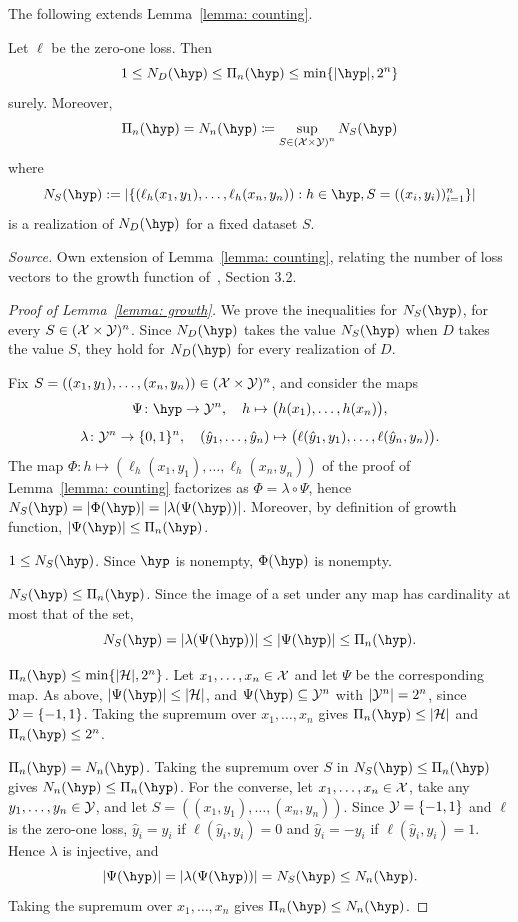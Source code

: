 \documentclass[reqno]{amsart}
\begin{document}
The following extends Lemma~\ref{lemma: counting}.

\begin{lemma}\label{lemma: growth}
Let $\ell$ be the zero-one loss. Then
\[
 1\le N_D(\hyp)\le\Pi_{n}(\hyp)\le\min\{\vert \hyp \vert,2^n\}
\]
surely. Moreover,
\[
\Pi_n(\hyp)  = N_n(\hyp) \coloneq \sup_{S\in{(\X\times\Y)}^n} N_S(\hyp)
\]
where \[ 
N_S(\hyp):= \left\vert\{(\ell_h(x_1,y_1),\ldots,\ell_h(x_n,y_n)):h\in\hyp, S = ((x_i,y_i))_{i=1}^n\}\right\vert 
\] is a realization of $N_D(\hyp)$ for a fixed dataset $S$. 

\textnormal{\emph{Source.} Own extension of Lemma~\ref{lemma: counting}, relating the number of loss vectors to the growth function of~\cite{mohri2018foundations}, Section 3.2.}

\begin{proof}[Proof of Lemma~\ref{lemma: growth}]
We prove the inequalities for $N_S(\hyp)$, for every $S\in(\mathcal{X}\times\mathcal{Y})^n$. Since $N_D(\hyp)$ takes the value $N_S(\hyp)$ when $D$ takes the value $S$, they hold for $N_D(\hyp)$ for every realization of $D$.

Fix $S=((x_1,y_1),\ldots,(x_n,y_n))\in(\mathcal{X}\times\mathcal{Y})^n$, and consider the maps
\[
\Psi\colon\hyp\to\Y^n,\quad h\mapsto\bigl(h(x_1),\ldots,h(x_n)\bigr),
\]
\[
\lambda\colon\mathcal{Y}^n\to\{0,1\}^n,\quad (\hat y_1,\ldots,\hat y_n)\mapsto\bigl(\ell(\hat y_1,y_1),\ldots,\ell(\hat y_n,y_n)\bigr).
\]
The map $\Phi\colon h\mapsto(\ell_h(x_1,y_1),\ldots,\ell_h(x_n,y_n))$ of the proof of Lemma~\ref{lemma: counting} factorizes as $\Phi=\lambda\circ\Psi$, hence $N_S(\hyp) = |\Phi(\hyp)| = |\lambda(\Psi(\hyp))|$. Moreover, by definition of growth function, $|\Psi(\hyp)|\le\Pi_n(\hyp)$.

\emph{$1\le N_S(\hyp)$.} Since $\hyp$ is nonempty, $\Phi(\hyp)$ is nonempty.

\emph{$N_S(\hyp)\le\Pi_n(\hyp)$.} Since the image of a set under any map has cardinality at most that of the set,
\[
N_S(\hyp) = |\lambda(\Psi(\hyp))| \le |\Psi(\hyp)| \le \Pi_n(\hyp).
\]

\emph{$\Pi_n(\hyp)\le\min\{\card,2^n\}$.} Let $x_1,\ldots,x_n\in\mathcal{X}$ and let $\Psi$ be the corresponding map. As above, $|\Psi(\hyp)|\le\card$, and $\Psi(\hyp)\subseteq\Y^n$ with $|\mathcal{Y}^n| = 2^n$, since $\mathcal{Y}=\{-1,1\}$. Taking the supremum over $x_1,\ldots,x_n$ gives $\Pi_n(\hyp)\le\card$ and $\Pi_n(\hyp)\le2^n$.

\emph{$\Pi_n(\hyp) = N_n(\hyp)$.} Taking the supremum over $S$ in $N_S(\hyp)\le\Pi_n(\hyp)$ gives $N_n(\hyp)\le\Pi_n(\hyp)$. For the converse, let $x_1,\ldots,x_n\in\mathcal{X}$, take any $y_1,\ldots,y_n\in\mathcal{Y}$, and let $S=((x_1,y_1),\ldots,(x_n,y_n))$. Since $\mathcal{Y}=\{-1,1\}$ and $\ell$ is the zero-one loss, $\hat y_i = y_i$ if $\ell(\hat y_i,y_i)=0$ and $\hat y_i = -y_i$ if $\ell(\hat y_i,y_i)=1$. Hence $\lambda$ is injective, and
\[
|\Psi(\hyp)| = |\lambda(\Psi(\hyp))| = N_S(\hyp) \le N_n(\hyp).
\]
Taking the supremum over $x_1,\ldots,x_n$ gives $\Pi_n(\hyp)\le N_n(\hyp)$.
\end{proof}
\end{lemma}
 
\end{document}
